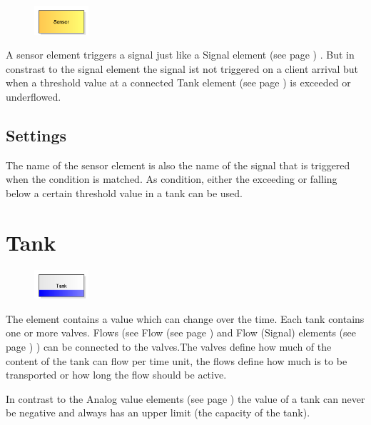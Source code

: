 \begin{figure}
\vspace{-22pt}
\includegraphics[width=2cm]{imageModelElementTankSensor.png}
\vspace{-22pt}
\end{figure}

A sensor element triggers a signal just like a Signal element (see page \pageref{ref:ModelElementSignal}) .
But in constrast to the signal element the signal ist not triggered on a client arrival
but when a threshold value at a connected Tank element (see page \pageref{ref:ModelElementTank}) 
is exceeded or underflowed.

\subsection*{Settings}

The name of the sensor element is also the name of the signal that is triggered when the condition is matched.
As condition, either the exceeding or falling below a certain threshold value in a tank can be used.


\section{Tank}
\label{ref:ModelElementTank}

\begin{figure}
\vspace{-22pt}
\includegraphics[width=2cm]{imageModelElementTank.png}
\vspace{-22pt}
\end{figure}

The element contains a value which can change over the time.
Each tank contains one or more valves. Flows (see Flow (see page \pageref{ref:ModelElementTankFlowByClient}) 
and Flow (Signal) elements (see page \pageref{ref:ModelElementTankFlowBySignal}) )
can be connected to the valves.The valves define how much of the content of the tank
can flow per time unit, the flows define how much is to be transported or how long
the flow should be active.

In contrast to the Analog value elements (see page \pageref{ref:ModelElementAnalogValue}) 
the value of a tank can never be negative and always has an upper limit (the capacity of the tank).

